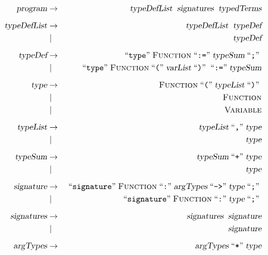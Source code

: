\documentclass{slides}
\newcommand{\quoted}[1]{\;\mbox{``\texttt{#1}''}\;}
\begin{document}
\begin{slide}{}


  \begin{eqnarray*}    
    \textsl{program}     & \rightarrow & \textsl{typeDefList} \;\; \textsl{signatures}  \;\;\textsl{typedTerms} \\[0.2cm]
    \textsl{typeDefList} & \rightarrow & \textsl{typeDefList}  \;\;\textsl{typeDef} \\[0.0cm]
                         & \mid        & \textsl{typeDef}               \\[0.2cm]
    \textsl{typeDef}     & \rightarrow & \quoted{type} \textsc{Function} \quoted{:=} \textsl{typeSum} \quoted{;} \\[0.0cm]
                         & \mid        & \quoted{type} \textsc{Function} \quoted{(} \textsl{varList} \quoted{)} \quoted{:=} \textsl{typeSum}  \\[0.2cm]    
    \textsl{type}        & \rightarrow & \textsc{Function} \quoted{(} \textsl{typeList} \quoted{)} \\[0.0cm]
                         & \mid        & \textsc{Function}                               \\[0.0cm]
                         & \mid        & \textsc{Variable}                               \\[0.2cm]
    \textsl{typeList}    & \rightarrow & \textsl{typeList} \quoted{,} \textsl{type} \\[0.0cm]
                         & \mid        &  \textsl{type}                     \\[0.2cm]
    \textsl{typeSum}     & \rightarrow & \textsl{typeSum} \quoted{+} \textsl{type} \\[0.0cm]
                         & \mid        & \textsl{type}                   \\[0.2cm]
    \textsl{signature}   & \rightarrow & \quoted{signature} \textsc{Function} \quoted{:} \textsl{argTypes} \quoted{->} \textsl{type} \quoted{;} \\[0.0cm]
                         & \mid        & \quoted{signature} \textsc{Function} \quoted{:} \textsl{type} \quoted{;} \\[0.2cm]
    \textsl{signatures}  & \rightarrow & \textsl{signatures}\;\; \textsl{signature} \\[0.0cm]
                         & \mid        & \textsl{signature}              \\[0.2cm]
    \textsl{argTypes}    & \rightarrow & \textsl{argTypes} \quoted{*} \textsl{type} \\[0.0cm]

\end{eqnarray*}
\end{slide}
\end{document}
